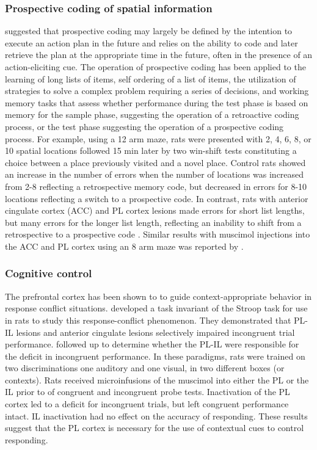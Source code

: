 \documentclass[doc, longtable]{apa6}
\begin{document}
\subsubsection{Prospective coding of spatial information}
\textcite{Kesner2011a} suggested that prospective coding may largely be defined by the intention to execute an action plan in the future and relies on the ability to code and later retrieve the plan at the appropriate time in the future, often in the presence of an action-eliciting cue. The operation of prospective coding has been applied to the learning of long lists of items, self ordering of a list of items, the utilization of strategies to solve a complex problem requiring a series of decisions, and working memory tasks that assess whether performance during the test phase is based on memory for the sample phase, suggesting the operation of a retroactive coding process, or the test phase suggesting the operation of a prospective coding process. For example, using a 12 arm maze, rats were presented with 2, 4, 6, 8, or 10 spatial locations followed 15 min later by two win-shift tests constituting a choice between a place previously visited and a novel place. Control rats showed an increase in the number of errors when the number of locations was increased from 2-8 reflecting a retrospective memory code, but decreased in errors for 8-10 locations reflecting a switch to a prospective code. In contrast, rats with anterior cingulate cortex (ACC) and PL cortex lesions made errors for short list lengths, but many errors for the longer list length, reflecting an inability to shift from a retrospective to a prospective code \parencite{Kesner1989}. Similar results with muscimol injections into the ACC and PL cortex using an 8 arm maze was reported by \parencite{Goto2008a}.

\subsubsection{Cognitive control}
The prefrontal cortex has been shown to to guide context-appropriate behavior in response conflict situations.\textcite{Haddon2007a} developed a task invariant of the Stroop task for use in rats to study this response-conflict phenomenon. They demonstrated that PL-IL lesions and anterior cingulate lesions selectively impaired incongruent trial performance. \textcite{Marquis2007a} followed up to determine whether the PL-IL were responsible for the deficit in incongruent performance. In these paradigms, rats were trained on two discriminations one auditory and one visual, in two different boxes (or contexts). Rats received microinfusions of the muscimol into either the PL or the IL prior to of congruent and incongruent probe tests. Inactivation of the PL cortex led to a deficit for incongruent trials, but left congruent performance intact. IL inactivation had no effect on the accuracy of responding. These results suggest that the PL cortex is necessary for the use of contextual cues to control responding.
	
\end{document}
